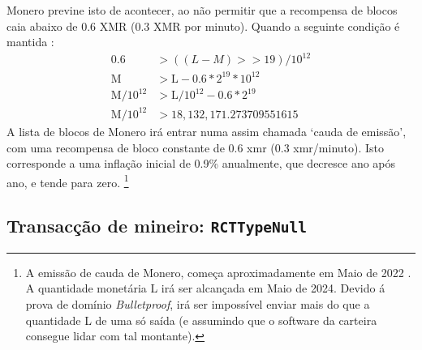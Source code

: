 Monero  previne isto de acontecer, ao não permitir que a recompensa de blocos caia abaixo de 0.6 XMR (0.3 XMR por minuto). Quando a seguinte condição é mantida :
\begin{align*}
               0.6 &> ((L-M) >> 19)/10^{12} \\
        \textrm{M} &> \textrm{L} - 0.6*2^{19}*10^{12} \\
\textrm{M}/10^{12} &> \textrm{L}/10^{12} - 0.6*2^{19} \\
\textrm{M}/10^{12} &> 18,132,171.273709551615
\end{align*}
A lista de blocos de Monero irá entrar numa assim chamada `cauda de emissão', com uma recompensa de bloco constante de 0.6 xmr (0.3 xmr/minuto). Isto corresponde a uma inflação inicial de 0.9\% anualmente, que decresce ano após ano, e tende para zero.
\footnote{A emissão de cauda de Monero, começa aproximadamente em Maio de 2022 \cite{monero-tail-emission}. A quantidade monetária L irá ser alcançada em Maio de 2024. Devido á prova de domínio {\em Bulletproof}, irá ser impossível enviar mais do que a quantidade L de uma só saída (e assumindo que o software da carteira consegue lidar com tal montante).}

\subsection{Transacção de mineiro: {\tt RCTTypeNull}}
\label{subsec:miner-transaction} %

